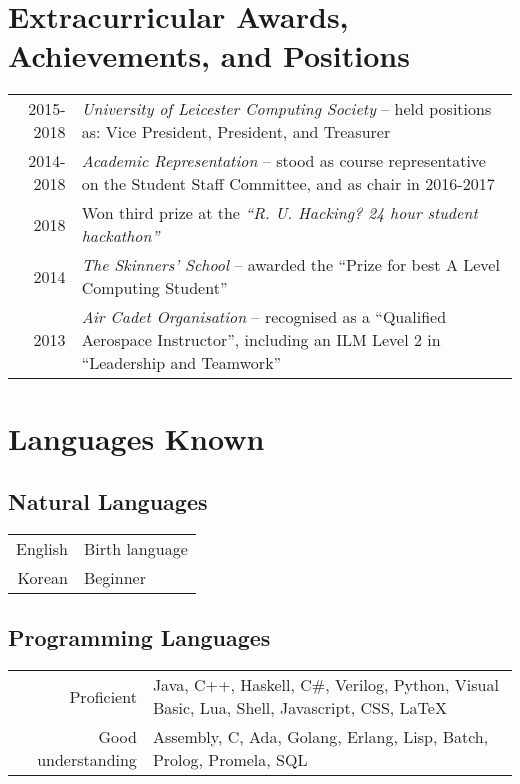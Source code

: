 \documentclass[a4paper]{article}
\begin{document}
\section*{Extracurricular Awards, Achievements, and Positions}
\begin{tabular}{rp{11.75cm}}
  2015-2018 & \emph{University of Leicester Computing Society} -- held positions as: Vice President, President, and Treasurer \\
  2014-2018 & \emph{Academic Representation} -- stood as course representative on the Student Staff Committee, and as chair in 2016-2017 \\
  2018 & Won third prize at the \emph{``R. U. Hacking? 24 hour student hackathon''} \\
  2014 & \emph{The Skinners' School} -- awarded the ``Prize for best A Level Computing Student'' \\
  2013 & \emph{Air Cadet Organisation} -- recognised as a ``Qualified Aerospace Instructor'', including an ILM Level 2 in ``Leadership and Teamwork''
\end{tabular}

\section*{Languages Known}
\subsection*{Natural Languages}
\begin{tabular}{rl}
  English & Birth language \\
  Korean & Beginner
\end{tabular}
\subsection*{Programming Languages}
\begin{tabular}{r|p{11.75cm}}
  Proficient & Java, C++, Haskell, C\#, Verilog, Python, Visual Basic, Lua, Shell, Javascript, CSS, LaTeX \\
  Good understanding & Assembly, C, Ada, Golang, Erlang, Lisp, Batch, Prolog, Promela, SQL
\end{tabular}
\end{document}
